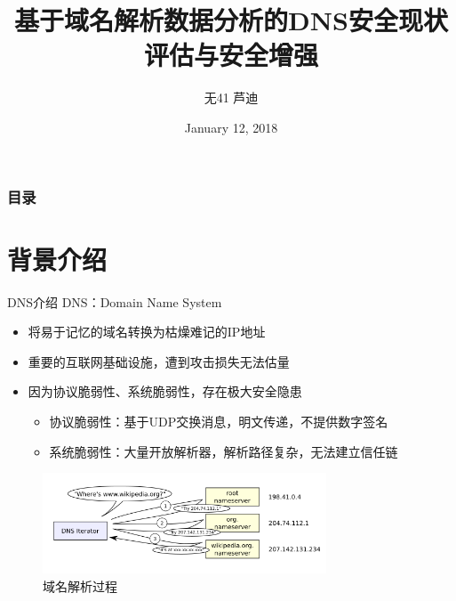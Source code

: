 \documentclass{beamer}
\title[毕设开题] %
{基于域名解析数据分析的DNS安全现状评估与安全增强}
\author[芦迪] %
{无41 芦迪 }
\institute[THU, EE] %
{
  指导老师：李星 \\
  \
  
  Department of Electronic Engineering,\\
  Tsinghua University
  
}
\date[2018.1.12] %
{January 12, 2018}
\begin{document}
\frame{\titlepage}


\begin{frame}
\frametitle{目录}
\tableofcontents
\end{frame}


\section{背景介绍}

\begin{frame}{DNS介绍}
  DNS：Domain Name System
  \begin{itemize}
    \item 将易于记忆的域名转换为枯燥难记的IP地址
    \item 重要的互联网基础设施，遭到攻击损失无法估量
    \item 因为协议脆弱性、系统脆弱性，存在极大安全隐患
    \begin{itemize}
      \item 协议脆弱性：基于UDP交换消息，明文传递，不提供数字签名
      \item 系统脆弱性：大量开放解析器，解析路径复杂，无法建立信任链 
    \end{itemize}
  \end{itemize}
  \begin{figure}
  \includegraphics[height=3cm,width=8.455cm]{images/Example_of_an_iterative_DNS_resolver.png}
  \caption{域名解析过程}
  \end{figure}

\end{frame}
\end{document}
